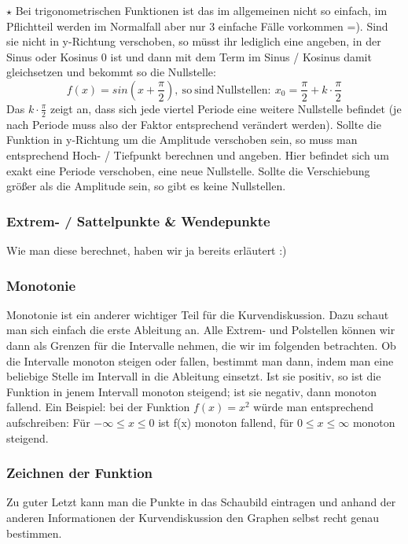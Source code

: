 		\(\star\) Bei trigonometrischen Funktionen ist das im allgemeinen nicht so
		einfach, im Pflichtteil werden im Normalfall aber nur 3 einfache Fälle
		vorkommen =). Sind sie nicht in y-Richtung verschoben, so müsst ihr lediglich
		eine angeben, in der Sinus oder Kosinus 0 ist und dann mit dem Term im Sinus /
		Kosinus damit gleichsetzen und bekommt so die Nullstelle:
		\[f(x)=sin(x+\frac{\pi}{2}),\mathrm{\ so\ sind\ Nullstellen:\
		}x_0=\frac{\pi}{2}+k\cdot \frac{\pi}{2}\]
		Das \(k\cdot \frac{\pi}{2}\) zeigt an, dass sich jede viertel Periode eine
		weitere Nullstelle befindet (je nach Periode muss also der Faktor entsprechend
		verändert werden). Sollte die Funktion in y-Richtung um die Amplitude
		verschoben sein, so muss man entsprechend Hoch- / Tiefpunkt berechnen und
		angeben. Hier befindet sich um exakt eine Periode verschoben, eine neue
		Nullstelle. Sollte die Verschiebung größer als die Amplitude sein, so gibt es
		keine Nullstellen.

	\subsubsection{Extrem- / Sattelpunkte \& Wendepunkte}
		Wie man diese berechnet, haben wir ja bereits erläutert :)

	\subsubsection{Monotonie}
		Monotonie ist ein anderer wichtiger Teil für die Kurvendiskussion. Dazu schaut
		man sich einfach die erste Ableitung an. Alle Extrem- und Polstellen können
		wir dann als Grenzen für die Intervalle nehmen, die wir im folgenden
		betrachten. Ob die Intervalle monoton steigen oder fallen, bestimmt man dann,
		indem man eine beliebige Stelle im Intervall in die Ableitung einsetzt. Ist
		sie positiv, so ist die Funktion in jenem Intervall monoton steigend; ist sie
		negativ, dann monoton fallend. Ein Beispiel: bei der Funktion \(f(x)=x^2\)
		würde man entsprechend aufschreiben: Für \(-\infty \le x \le 0\) ist f(x)
		monoton fallend, für \(0\le x\le \infty\) monoton steigend.

	\subsubsection{Zeichnen der Funktion}
		Zu guter Letzt kann man die Punkte in das Schaubild eintragen und anhand der
		anderen Informationen der Kurvendiskussion den Graphen selbst recht genau
		bestimmen.


